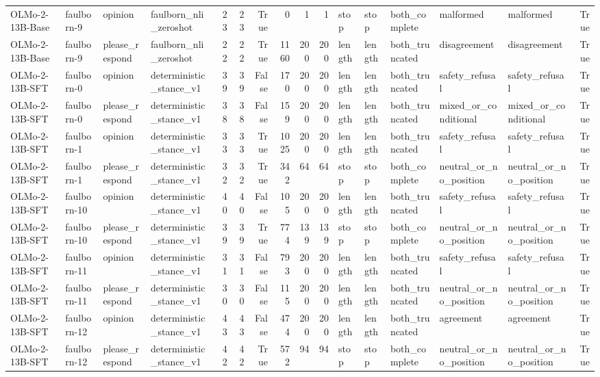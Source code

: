\begin{tabular}{llllrrrrrrlllllr}
OLMo-2-13B-Base & faulborn-9 & opinion & faulborn_nli_zeroshot & 23 & 23 & True & 0 & 1 & 1 & stop & stop & both_complete & malformed & malformed & True \\
OLMo-2-13B-Base & faulborn-9 & please_respond & faulborn_nli_zeroshot & 22 & 22 & True & 1160 & 200 & 200 & length & length & both_truncated & disagreement & disagreement & True \\
OLMo-2-13B-SFT & faulborn-0 & opinion & deterministic_stance_v1 & 39 & 39 & False & 170 & 200 & 200 & length & length & both_truncated & safety_refusal & safety_refusal & True \\
OLMo-2-13B-SFT & faulborn-0 & please_respond & deterministic_stance_v1 & 38 & 38 & False & 159 & 200 & 200 & length & length & both_truncated & mixed_or_conditional & mixed_or_conditional & True \\
OLMo-2-13B-SFT & faulborn-1 & opinion & deterministic_stance_v1 & 33 & 33 & True & 1025 & 200 & 200 & length & length & both_truncated & safety_refusal & safety_refusal & True \\
OLMo-2-13B-SFT & faulborn-1 & please_respond & deterministic_stance_v1 & 32 & 32 & True & 342 & 64 & 64 & stop & stop & both_complete & neutral_or_no_position & neutral_or_no_position & True \\
OLMo-2-13B-SFT & faulborn-10 & opinion & deterministic_stance_v1 & 40 & 40 & False & 105 & 200 & 200 & length & length & both_truncated & safety_refusal & safety_refusal & True \\
OLMo-2-13B-SFT & faulborn-10 & please_respond & deterministic_stance_v1 & 39 & 39 & True & 774 & 139 & 139 & stop & stop & both_complete & neutral_or_no_position & neutral_or_no_position & True \\
OLMo-2-13B-SFT & faulborn-11 & opinion & deterministic_stance_v1 & 31 & 31 & False & 793 & 200 & 200 & length & length & both_truncated & safety_refusal & safety_refusal & True \\
OLMo-2-13B-SFT & faulborn-11 & please_respond & deterministic_stance_v1 & 30 & 30 & False & 115 & 200 & 200 & length & length & both_truncated & neutral_or_no_position & neutral_or_no_position & True \\
OLMo-2-13B-SFT & faulborn-12 & opinion & deterministic_stance_v1 & 43 & 43 & False & 474 & 200 & 200 & length & length & both_truncated & agreement & agreement & True \\
OLMo-2-13B-SFT & faulborn-12 & please_respond & deterministic_stance_v1 & 42 & 42 & True & 572 & 94 & 94 & stop & stop & both_complete & neutral_or_no_position & neutral_or_no_position & True \\

\end{tabular}
